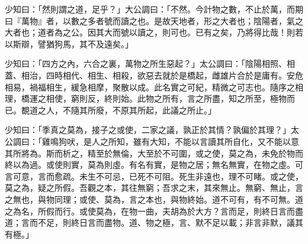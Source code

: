 \begin{pinyinscope}
少知曰：「然則謂之道，足乎？」大公調曰：「不然。今計物之數，不止於萬，而期曰『萬物』者，以數之多者號而讀之也。是故天地者，形之大者也；陰陽者，氣之大者也；道者為之公。因其大而號以讀之，則可也。已有之矣，乃將得比哉！則若以斯辯，譬猶狗馬，其不及遠矣。」

少知曰：「四方之內，六合之裏，萬物之所生惡起？」太公調曰：「陰陽相照、相蓋、相治，四時相代、相生、相殺，欲惡去就於是橋起，雌雄片合於是庸有。安危相易，禍福相生，緩急相摩，聚散以成。此名實之可紀，精微之可志也。隨序之相理，橋運之相使，窮則反，終則始。此物之所有，言之所盡，知之所至，極物而已。覩道之人，不隨其所廢，不原其所起，此議之所止。」

少知曰：「季真之莫為，接子之或使，二家之議，孰正於其情？孰偏於其理？」太公調曰：「雞鳴狗吠，是人之所知，雖有大知，不能以言讀其所自化，又不能以意其所將為。斯而析之，精至於無倫，大至於不可圍，或之使，莫之為，未免於物而終以為過。或使則實，莫為則虛。有名有實，是物之居；無名無實，在物之虛。可言可意，言而愈疏。未生不可忌，已死不可阻。死生非遠也，理不可睹。或之使，莫之為，疑之所假。吾觀之本，其往無窮；吾求之末，其來無止。無窮、無止，言之無也，與物同理；或使、莫為，言之本也，與物終始。道不可有，有不可無。道之為名，所假而行。或使莫為，在物一曲，夫胡為於大方？言而足，則終日言而盡道；言而不足，則終日言而盡物。道、物之極，言、默不足以載；非言非默，議其有極。」


\end{pinyinscope}